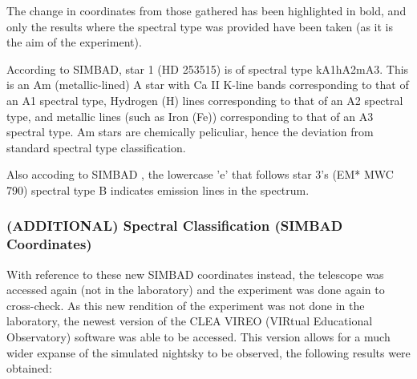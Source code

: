 \documentclass[12pt]{article}
\begin{document}
The change in coordinates from those gathered has been highlighted in bold, and only the results where the spectral type was provided have been taken (as it is the aim of the experiment).

According to SIMBAD, star 1 (HD 253515) is of spectral type kA1hA2mA3. This is an Am (metallic-lined) A star with Ca II K-line bands corresponding to that of an A1 spectral type,
Hydrogen (H) lines corresponding to that of an A2 spectral type, and metallic lines (such as Iron (Fe)) corresponding to that of an A3 spectral type. Am stars are chemically peliculiar, hence 
the deviation from standard spectral type classification.

Also accoding to SIMBAD \cite{SIMBADguide}, the lowercase 'e' that follows star 3's (EM* MWC 790) spectral type B indicates emission lines in the spectrum.

\subsubsection{(ADDITIONAL) Spectral Classification (SIMBAD Coordinates)}

With reference to these new SIMBAD coordinates instead, the telescope was accessed again (not in the laboratory) and the experiment was done again to cross-check. As this new rendition of the experiment was not done in
the laboratory, the newest version of the CLEA VIREO (VIRtual Educational Observatory) software was able to be accessed. This version allows for a much wider expanse of the simulated nightsky to be observed, the following results were obtained:
\end{document}
